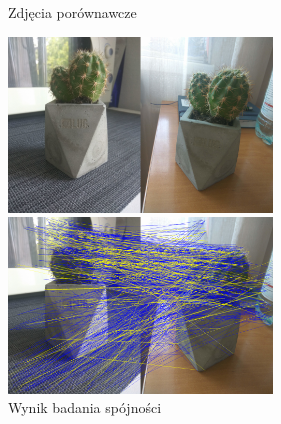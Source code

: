 \documentclass[../main.tex]{subfiles}
\begin{document}
    \begin{figure}[H]
    \centering
    \begin{minipage}{.5\textwidth}
        \caption{Zdjęcia porównawcze}
        \centering
        \includegraphics[width=7cm]{cactus_clean_out}
    \end{minipage}%
    \begin{minipage}{.5\textwidth}
        \caption{Wynik badania spójności}
        \includegraphics[width=7cm]{cactus_pairs_conspairs_out}
    \end{minipage}%
    \end{figure}
\end{document}
